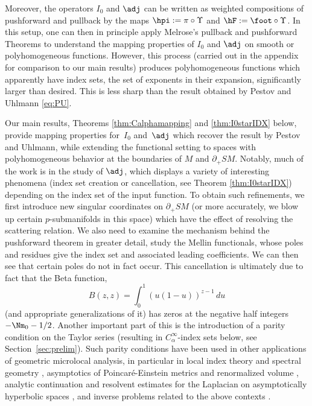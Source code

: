 Moreover, the operators $I_0$ and $\adj$ can be written as weighted compositions of pushforward and pullback by the maps $\hpi:= \pi\circ\Upsilon$ and $\hF:= \foot\circ\Upsilon$. In this setup, one can then in principle apply Melrose's pullback and pushforward Theorems to understand the mapping properties of $I_0$ and $\adj$ on smooth or polyhomogeneous functions. However, this process (carried out in the appendix for comparison to our main results) produces polyhomogeneous functions which apparently have index sets, \ie the set of exponents in their expansion, significantly larger than desired. This is less sharp than the result obtained by Pestov and Uhlmann \eqref{eq:PU}.

Our main results, Theorems \ref{thm:Calphamapping} and \ref{thm:I0starIDX} below, provide mapping properties for~$I_0$ and~$\adj$ which recover the result by Pestov and Uhlmann, while extending the functional setting to spaces with polyhomogeneous behavior at the boundaries of $M$ and $\partial_+ SM$. Notably, much of the work is in the study of $\adj$, which displays a variety of interesting phenomena (\eg index set creation or cancellation, see Theorem \ref{thm:I0starIDX}) depending on the index set of the input function. To obtain such refinements, we first introduce new singular coordinates on $\partial_+ SM$ (or more accurately, we blow up certain $p$-submanifolds in this space) which have the effect of resolving the scattering relation. We also need to examine the mechanism behind the pushforward theorem in greater detail, \ie study the Mellin functionals, whose poles and residues give the index set and associated leading coefficients. We can then see that certain poles do not in fact occur.
This cancellation is ultimately due to fact that the Beta function,
\begin{equation}
B(z,z) = \int_0^1 (u(1-u))^{z-1}\, du
\label{eq:Beta}
\end{equation}
(and appropriate generalizations of it) has zeros at the negative half integers $-\Nm_0-1/2$. Another important part of this is the introduction of a parity condition on the Taylor series (resulting in $C_\alpha^\infty$-index sets below, see Section~\ref{sec:prelim}). Such parity conditions have been used in other applications of geometric microlocal analysis, in particular in local index theory and spectral geometry \cite{Melrose1993,Mazzeo2014}, asymptotics of Poincaré-Einstein metrics \cite{Fefferman1985} and renormalized volume \cite{Albin2009,Bahuaud2019}, analytic continuation and resolvent estimates for the Laplacian on asymptotically hyperbolic spaces \cite{Vasy2013,Vasy2017}, and inverse problems related to the above contexts \cite{MarxKuo2024,Eptaminitakis2021}.

